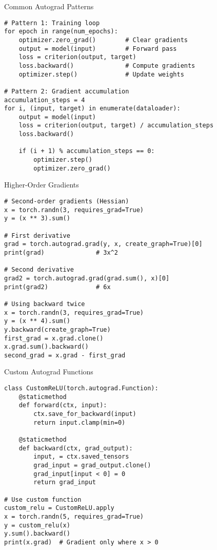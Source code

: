 \documentclass[aspectratio=169,10pt]{beamer}
\begin{document}
\begin{frame}[fragile]{Common Autograd Patterns}
\begin{lstlisting}
# Pattern 1: Training loop
for epoch in range(num_epochs):
    optimizer.zero_grad()        # Clear gradients
    output = model(input)        # Forward pass
    loss = criterion(output, target)
    loss.backward()              # Compute gradients
    optimizer.step()             # Update weights

# Pattern 2: Gradient accumulation
accumulation_steps = 4
for i, (input, target) in enumerate(dataloader):
    output = model(input)
    loss = criterion(output, target) / accumulation_steps
    loss.backward()
    
    if (i + 1) % accumulation_steps == 0:
        optimizer.step()
        optimizer.zero_grad()
\end{lstlisting}
\end{frame}

\begin{frame}[fragile]{Higher-Order Gradients}
\begin{lstlisting}
# Second-order gradients (Hessian)
x = torch.randn(3, requires_grad=True)
y = (x ** 3).sum()

# First derivative
grad = torch.autograd.grad(y, x, create_graph=True)[0]
print(grad)              # 3x^2

# Second derivative
grad2 = torch.autograd.grad(grad.sum(), x)[0]
print(grad2)             # 6x

# Using backward twice
x = torch.randn(3, requires_grad=True)
y = (x ** 4).sum()
y.backward(create_graph=True)
first_grad = x.grad.clone()
x.grad.sum().backward()
second_grad = x.grad - first_grad
\end{lstlisting}
\end{frame}

\begin{frame}[fragile]{Custom Autograd Functions}
\begin{lstlisting}
class CustomReLU(torch.autograd.Function):
    @staticmethod
    def forward(ctx, input):
        ctx.save_for_backward(input)
        return input.clamp(min=0)
    
    @staticmethod
    def backward(ctx, grad_output):
        input, = ctx.saved_tensors
        grad_input = grad_output.clone()
        grad_input[input < 0] = 0
        return grad_input

# Use custom function
custom_relu = CustomReLU.apply
x = torch.randn(5, requires_grad=True)
y = custom_relu(x)
y.sum().backward()
print(x.grad)  # Gradient only where x > 0
\end{lstlisting}
\end{frame}
\end{document}
